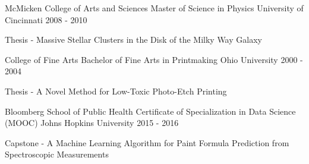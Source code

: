 

\begin{cventries}

  \cventry
    {McMicken College of Arts and Sciences} %
    {Master of Science in Physics} %
    {University of Cincinnati} %
    {2008 - 2010} %
    {
      \begin{cvitems} %
        \item {Thesis - Massive Stellar Clusters in the Disk of the Milky Way Galaxy}
      \end{cvitems}
    }

  \cventry
    {College of Fine Arts} %
    {Bachelor of Fine Arts in Printmaking} %
    {Ohio University} %
    {2000 - 2004} %
    {
      \begin{cvitems} %
        \item {Thesis - A Novel Method for Low-Toxic Photo-Etch Printing}
      \end{cvitems}
    }

  \cventry
    {Bloomberg School of Public Health} %
    {Certificate of Specialization in Data Science (MOOC)} %
    {Johns Hopkins University} %
    {2015 - 2016} %
    {
      \begin{cvitems} %
        \item {Capstone - A Machine Learning Algorithm for Paint Formula Prediction from Spectroscopic Measurements}
      \end{cvitems}
    }



\end{cventries}
